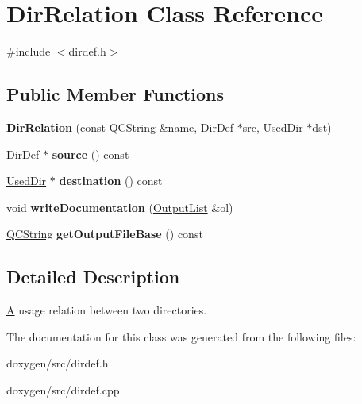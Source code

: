 \hypertarget{class_dir_relation}{}\section{Dir\+Relation Class Reference}
\label{class_dir_relation}


{\ttfamily \#include $<$dirdef.\+h$>$}

\subsection*{Public Member Functions}
\begin{DoxyCompactItemize}
\item 
\mbox{\label{class_dir_relation_a2d86d0c822e9dbb36c1997ed81bcce77}} 
{\bfseries Dir\+Relation} (const \mbox{\hyperlink{class_q_c_string}{Q\+C\+String}} \&name, \mbox{\hyperlink{class_dir_def}{Dir\+Def}} $\ast$src, \mbox{\hyperlink{class_used_dir}{Used\+Dir}} $\ast$dst)
\item 
\mbox{\label{class_dir_relation_a536080c8174782ebaeb38ed11acbd6bc}} 
\mbox{\hyperlink{class_dir_def}{Dir\+Def}} $\ast$ {\bfseries source} () const
\item 
\mbox{\label{class_dir_relation_a7c901e021d028cae9455deb819735174}} 
\mbox{\hyperlink{class_used_dir}{Used\+Dir}} $\ast$ {\bfseries destination} () const
\item 
\mbox{\label{class_dir_relation_a5fa861050993dafb351589f2f1c05326}} 
void {\bfseries write\+Documentation} (\mbox{\hyperlink{class_output_list}{Output\+List}} \&ol)
\item 
\mbox{\label{class_dir_relation_a73890fdede27fd42215794b10b76b05a}} 
\mbox{\hyperlink{class_q_c_string}{Q\+C\+String}} {\bfseries get\+Output\+File\+Base} () const
\end{DoxyCompactItemize}


\subsection{Detailed Description}
\mbox{\hyperlink{class_a}{A}} usage relation between two directories. 

The documentation for this class was generated from the following files\+:\begin{DoxyCompactItemize}
\item 
doxygen/src/dirdef.\+h\item 
doxygen/src/dirdef.\+cpp\end{DoxyCompactItemize}
